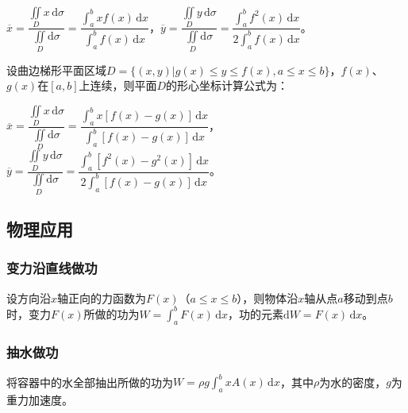 \documentclass[UTF8, 12pt]{ctexart}
\begin{document}
        $\overline{x}=\dfrac{\iint\limits_Dx\,\textrm{d}\sigma}{\iint\limits_D\textrm{d}\sigma}=\dfrac{\int_a^bxf(x)\,\textrm{d}x}{\int_a^bf(x)\,\textrm{d}x}$，$\overline{y}=\dfrac{\iint\limits_Dy\,\textrm{d}\sigma}{\iint\limits_D\textrm{d}\sigma}=\dfrac{\int_a^bf^2(x)\,\textrm{d}x}{2\int_a^bf(x)\,\textrm{d}x}$。

        设曲边梯形平面区域$D=\{(x,y)|g(x)\leqslant y\leqslant f(x),a\leqslant x\leqslant b\}$，$f(x)$、$g(x)$在$[a,b]$上连续，则平面$D$的形心坐标计算公式为：\medskip



        $\overline{x}=\dfrac{\iint\limits_Dx\,\textrm{d}\sigma}{\iint\limits_D\textrm{d}\sigma}=\dfrac{\int_a^bx[f(x)-g(x)]\,\textrm{d}x}{\int_a^b[f(x)-g(x)]\,\textrm{d}x}$，$\overline{y}=\dfrac{\iint\limits_Dy\,\textrm{d}\sigma}{\iint\limits_D\textrm{d}\sigma}=\dfrac{\int_a^b[f^2(x)-g^2(x)]\,\textrm{d}x}{2\int_a^b[f(x)-g(x)]\,\textrm{d}x}$。

        \subsection{物理应用}

        \subsubsection{变力沿直线做功}

        设方向沿$x$轴正向的力函数为$F(x)$（$a\leqslant x\leqslant b$），则物体沿$x$轴从点$a$移动到点$b$时，变力$F(x)$所做的功为$W=\int_a^bF(x)\,\textrm{d}x$，功的元素$\textrm{d}W=F(x)\,\textrm{d}x$。

        \subsubsection{抽水做功}

        将容器中的水全部抽出所做的功为$W=\rho g\int_a^bxA(x)\,\textrm{d}x$，其中$\rho$为水的密度，$g$为重力加速度。
\end{document}
